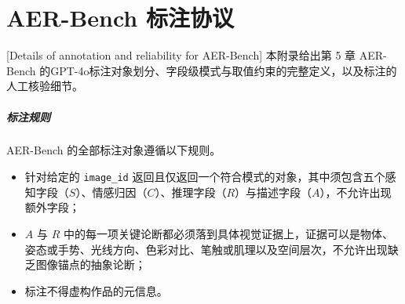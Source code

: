 \chapter{AER-Bench 标注协议}[Details of annotation and reliability for AER-Bench]
\label{app:aerbench_supplement}
本附录给出第 5 章 AER-Bench 的GPT-4o标注对象划分、字段级模式与取值约束的完整定义，以及标注的人工核验细节。




\label{app:annotation_protocol}


\paragraph{标注规则}
AER-Bench 的全部标注对象遵循以下规则。
\begin{itemize}
    \item 针对给定的 \texttt{image\_id} 返回且仅返回一个符合模式的对象，其中须包含五个感知字段（$S$）、情感归因（$C$）、推理字段（$R$）与描述字段（$A$），不允许出现额外字段；
    \item $A$ 与 $R$ 中的每一项关键论断都必须落到具体视觉证据上，证据可以是物体、姿态或手势、光线方向、色彩对比、笔触或肌理以及空间层次，不允许出现缺乏图像锚点的抽象论断；
    \item 标注不得虚构作品的元信息。
\end{itemize}

